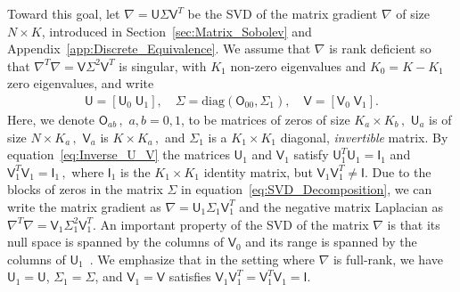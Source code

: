 \documentclass[english,12pt,jmp,graphicx]{revtex4-1}
\newcommand{\secref}[1]{Section~\ref{#1}}
\newcommand{\appref}[1]{Appendix~\ref{#1}}
\newcommand{\Um}{\mathsf{U}}
\newcommand{\Vm}{\mathsf{V}}
\newcommand{\Ib}{\mathsf{I}}
\newcommand{\Om}{\mathsf{O}}
\begin{document}
Toward this goal, let $\nabla=\Um\Sigma\Vm^T$ be the SVD of the
matrix gradient $\nabla$ of size $N\times K$, introduced in 
\secref{sec:Matrix_Sobolev} and \appref{app:Discrete_Equivalence}. We
assume that $\nabla$ is rank 
deficient so that $\nabla^T\nabla=\Vm\Sigma^2\Vm^T$ is singular,
with $K_1$ non-zero eigenvalues and $K_0=K-K_1$ zero eigenvalues, and
write 
%
\begin{align}\label{eq:SVD_Decomposition}
  \Um=[\Um_0\;\Um_1],  
  \quad
  \Sigma = \text{diag}(\Om_{00},\Sigma_1),
\quad
  \Vm=[\Vm_0\;\Vm_1].
\end{align}  
%
Here, we denote $\Om_{ab}\,,$ $a,b=0,1$, to be matrices of zeros of size
$K_a\times K_b\,,$ $\Um_a$ is of size $N\times K_a\,,$ $\Vm_a$
is $K\times K_a\,,$  and $\Sigma_1$ is a $K_1\times K_1$ diagonal,
\emph{invertible} matrix. By equation~\eqref{eq:Inverse_U_V} the
matrices $\Um_1$ and $\Vm_1$ satisfy $\Um_1^T\Um_1=\Ib_1$ and
$\Vm_1^T\Vm_1=\Ib_1\,,$ 
where $\Ib_1$ is the $K_1\times K_1$ identity matrix, but
$\Vm_1\Vm_1^T\neq\Ib$. Due to the blocks of zeros in the matrix
$\Sigma$ in equation~\eqref{eq:SVD_Decomposition}, we can write the 
matrix gradient as $\nabla=\Um_1\Sigma_1\Vm_1^T$ and the 
negative matrix Laplacian as
$\nabla^T\nabla=\Vm_1\Sigma_1^2\Vm_1^T$. 
An important property  
of the SVD of the matrix $\nabla$ is that its null
space is spanned by the columns of $\Vm_0$ and its range is spanned by
the columns of $\Um_1$~\cite{Demmel:1997}. We emphasize that in the
setting where $\nabla$ is full-rank, we have $\Um_1=\Um$,
$\Sigma_1=\Sigma$, and $\Vm_1=\Vm$ satisfies
$\Vm_1\Vm_1^T=\Vm_1^T\Vm_1=\Ib$. 
\end{document}
